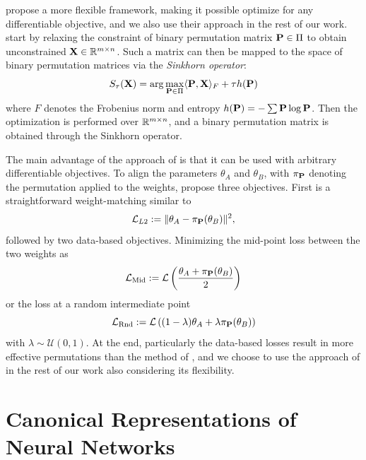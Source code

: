 \citet{penaReBasinImplicitSinkhorn2023} propose a more flexible framework, making it possible optimize for any differentiable objective, and we also use their approach in the rest of our work. \citet{penaReBasinImplicitSinkhorn2023} start by relaxing the constraint of binary permutation matrix $\mathbf{P} \in \Pi$ to obtain unconstrained $\mathbf{X} \in \mathbb{R}^{m\times n}$. Such a matrix can then be mapped to the space of binary permutation matrices via the \textit{Sinkhorn operator}:
\begin{equation} \label{eq:sinkhorn}
    S_\tau(\mathbf{X}) = \arg\max_{\mathbf{P} \in \Pi} \langle \mathbf{P}, \mathbf{X} \rangle_F + \tau h(\mathbf{P})
\end{equation}
where $F$ denotes the Frobenius norm and entropy $h(\mathbf{P}) = - \sum \mathbf{P} \log \mathbf{P}$. Then the optimization is performed over $\mathbb{R}^{m \times n}$, and a binary permutation matrix is obtained through the Sinkhorn operator. 

The main advantage of the approach of \citet{penaReBasinImplicitSinkhorn2023} is that it can be used with arbitrary differentiable objectives. To align the parameters $\theta_A$ and $\theta_B$, with $\pi_{\mathbf{P}}$ denoting the permutation applied to the weights, \citet{penaReBasinImplicitSinkhorn2023} propose three objectives. First is a straightforward weight-matching similar to \citep{ainsworthGitReBasinMerging2023}
\begin{equation}
    \mathcal{L}_{L2} := \Vert \theta_A - \pi_{\mathbf{P}} (\theta_B) \Vert^2,
\end{equation}
followed by two data-based objectives. Minimizing the mid-point loss between the two weights as
\begin{equation}
    \mathcal{L}_{\text{Mid}} := \mathcal{L} \left( \frac{\theta_A + \pi_{\mathbf{P}} (\theta_B)}{2} \right) 
\end{equation}
or the loss at a random intermediate point 
\begin{equation}
    \mathcal{L}_{\text{Rnd}} := \mathcal{L} \left( (1-\lambda)\theta_A + \lambda \pi_{\mathbf{P}} (\theta_B) \right) 
\end{equation}
with $\lambda \sim \mathcal{U}(0,1)$. At the end, particularly the data-based losses result in more effective permutations than the method of \citep{ainsworthGitReBasinMerging2023}, and we choose to use the approach of \citet{penaReBasinImplicitSinkhorn2023} in the rest of our work also considering its flexibility. 

\section{Canonical Representations of Neural Networks}

